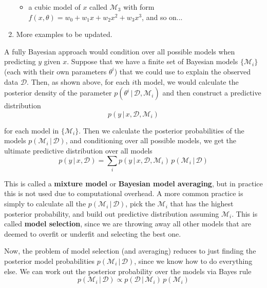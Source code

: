 \begin{enumerate}
\begin{itemize}
      \item a cubic model of $x$ called $\mathcal{M}_3$ with form $f(x, \theta) = w_0 + w_1 x + w_2 x^2 + w_3 x^3$, and so on...
    \end{itemize}
    \item More examples to be updated.
  \end{enumerate}

  A fully Bayesian approach would condition over all possible models when predicting $y$ given $x$. Suppose that we have a finite set of Bayesian models $\{\mathcal{M}_i\}$ (each with their own parameters $\theta^i$) that we could use to explain the observed data $\mathcal{D}$. Then, as shown above, for each $i$th model, we would calculate the posterior density of the parameter $p(\theta^i\,|\,\mathcal{D}, \mathcal{M}_i)$ and then construct a predictive distribution
  \begin{equation}
    p(y\,|\,x, \mathcal{D}, \mathcal{M}_i)
  \end{equation}

  for each model in $\{\mathcal{M}_i\}$. Then we calculate the posterior probabilities of the models $p(\mathcal{M}_i\,|\,\mathcal{D})$, and conditioning over all possible models, we get the ultimate predictive distribution over all models
  \begin{equation}
    p(y\,|\,x, \mathcal{D}) = \sum_i p(y\,|\,x, \mathcal{D}, \mathcal{M}_i)\, p(\mathcal{M}_i\,|\,\mathcal{D})
  \end{equation}

  This is called a \textbf{mixture model} or \textbf{Bayesian model averaging}, but in practice this is not used due to computational overhead. A more common practice is simply to calculate all the $p(\mathcal{M}_i\,|\,\mathcal{D})$, pick the $\mathcal{M}_i$ that has the highest posterior probability, and build out predictive distribution assuming $\mathcal{M}_i$. This is called \textbf{model selection}, since we are throwing away all other models that are deemed to overfit or underfit and selecting the best one.

  Now, the problem of model selection (and averaging) reduces to just finding the posterior model probabilities $p(\mathcal{M}_i \,|\,\mathcal{D})$, since we know how to do everything else. We can work out the posterior probability over the models via Bayes rule
  \begin{equation}
    p(\mathcal{M}_i \,|\,\mathcal{D}) \propto p(\mathcal{D}\,|\,\mathcal{M}_i)\, p(\mathcal{M}_i)
  \end{equation}

